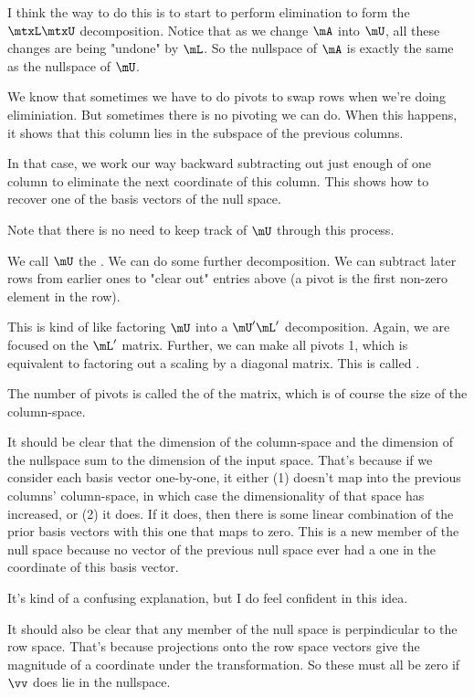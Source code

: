 I think the way to do this is to start to perform elimination to form
the $\mLU$ decomposition. Notice that as we change $\mA$ into $\mU$, all
these changes are being "undone" by $\mL$. So the nullspace of $\mA$ is
exactly the same as the nullspace of $\mU$.

We know that sometimes we have to do pivots to swap rows when we're
doing eliminiation. But sometimes there is no pivoting we can do. When
this happens, it shows that this column lies in the subspace of the
previous columns.

In that case, we work our way backward subtracting out just enough of
one column to eliminate the next coordinate of this column. This shows
how to recover one of the basis vectors of the null space.

Note that there is no need to keep track of $\mU$ through this process.

We call $\mU$ the . We can do some further
decomposition. We can subtract later rows from earlier ones to "clear
out" entries above  (a pivot is the first non-zero
element in the row).

This is kind of like factoring $\mU$ into a $\mU'\mL'$ decomposition.
Again, we are focused on the $\mL'$ matrix. Further, we can make all
pivots 1, which is equivalent to factoring out a scaling by a diagonal
matrix. This is called .

The number of pivots is called the  of the matrix, which is
of course the size of the column-space.

It should be clear that the dimension of the column-space and the
dimension of the nullspace sum to the dimension of the input
space. That's because if we consider each basis vector one-by-one, it
either (1) doesn't map into the previous columns' column-space, in
which case the dimensionality of that space has increased, or (2) it
does. If it does, then there is some linear combination of the prior
basis vectors with this one that maps to zero. This is a new member of
the null space because no vector of the previous null space ever had a
one in the coordinate of this basis vector.

It's kind of a confusing explanation, but I do feel confident in this
idea.

It should also be clear that any member of the null space is
perpindicular to the row space. That's because projections onto the row
space vectors give the magnitude of a coordinate under the
transformation. So these must all be zero if $\vv$ does lie in the
nullspace.
